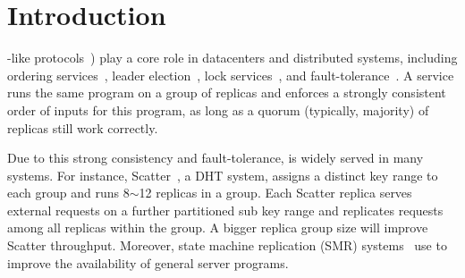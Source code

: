 \section{Introduction} \label{sec:intro}


\paxos-like protocols~\cite{paxos:practical,paxos,paxos:simple,paxos:complex}) 
play a core role in datacenters and distributed systems, including ordering 
services~\cite{ellis:thesis,manos:hotdep10,scatter:sosp11}, 
leader election~\cite{zookeeper}, lock services~\cite{chubby:osdi}, and 
fault-tolerance~\cite{eve:osdi12,rex:eurosys14,crane:sosp15}. A \paxos service 
runs the same program on a group of replicas and enforces a strongly 
consistent order of inputs for this program, as long as a quorum (typically, 
majority) of replicas still work correctly.

Due to this strong consistency and fault-tolerance, \paxos is widely served 
in many systems. For instance, Scatter~\cite{scatter:sosp11}, a DHT system,
assigns a distinct key range to each \paxos group and runs 8$\sim$12 replicas 
in a group. Each Scatter replica serves external requests on a further 
partitioned sub key range and replicates requests among all replicas within the 
group. A bigger replica group size will improve Scatter throughput. 
Moreover, state machine replication (SMR) systems~\cite{ crane:sosp15, 
eve:osdi12, rex:eurosys14} use \paxos to improve the availability of 
general server programs.






